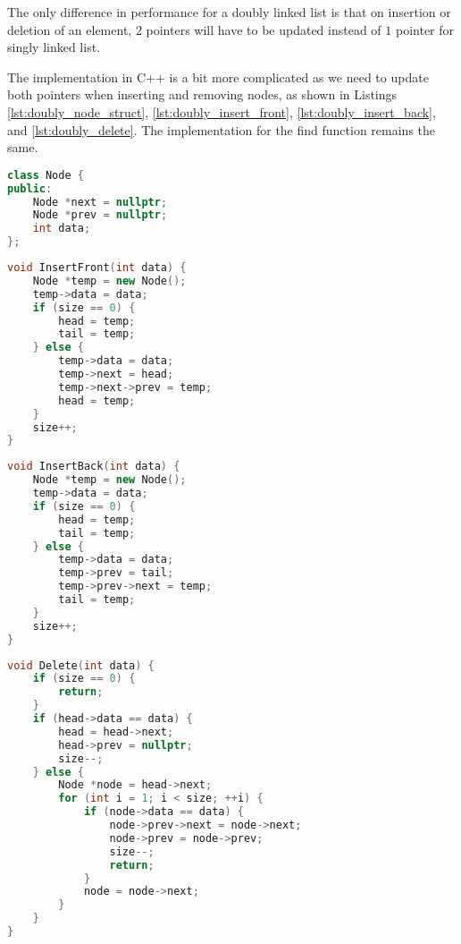 The only difference in performance for a doubly linked list is that on insertion or deletion of an element, $2$ pointers will have to be updated instead of $1$ pointer for singly linked list.

The implementation in C++ is a bit more complicated as we need to update both pointers when inserting and removing nodes, as shown in Listings \ref{lst:doubly_node_struct}, \ref{lst:doubly_insert_front}, \ref{lst:doubly_insert_back}, and \ref{lst:doubly_delete}. The implementation for the find function remains the same. 

\begin{lstlisting}[float,
                  language = C++,
                  caption = {Data structure for node in doubly linked list in C++.},
                  label = {lst:doubly_node_struct}]
class Node {
public:
    Node *next = nullptr;
    Node *prev = nullptr;
    int data;
};
\end{lstlisting}

\begin{lstlisting}[float,
                  language = C++,
                  caption = {Insert to the head function for doubly linked list in C++.},
                  label = {lst:doubly_insert_front}]
void InsertFront(int data) {
    Node *temp = new Node();
    temp->data = data;
    if (size == 0) {
        head = temp;
        tail = temp;
    } else {
        temp->data = data;
        temp->next = head;
        temp->next->prev = temp;
        head = temp;
    }
    size++;
}
\end{lstlisting}

\begin{lstlisting}[float,
                  language = C++,
                  caption = {Insert to the tail function for doubly linked list in C++.},
                  label = {lst:doubly_insert_back}]
void InsertBack(int data) {
    Node *temp = new Node();
    temp->data = data;
    if (size == 0) {
        head = temp;
        tail = temp;
    } else {
        temp->data = data;
        temp->prev = tail;
        temp->prev->next = temp;
        tail = temp;
    }
    size++;
}
\end{lstlisting}

\begin{lstlisting}[float,
                  language = C++,
                  caption = {Delete function for for doubly linked list in C++.},
                  label = {lst:doubly_delete}]
void Delete(int data) {
    if (size == 0) {
        return;
    }
    if (head->data == data) {
        head = head->next;
        head->prev = nullptr;
        size--;
    } else {
        Node *node = head->next;
        for (int i = 1; i < size; ++i) {
            if (node->data == data) {
                node->prev->next = node->next;
                node->prev = node->prev;
                size--;
                return;
            }
            node = node->next;
        }
    }
}
\end{lstlisting}

